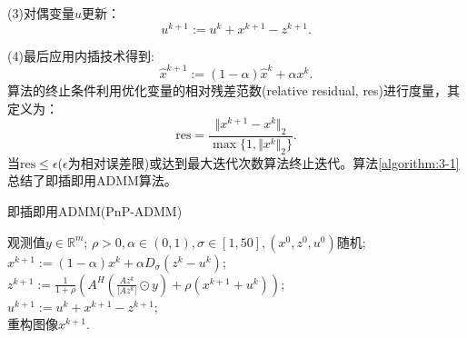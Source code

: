 (3)对偶变量$u$更新：
\begin{equation} \label{equation:3-6}
	u^{k+1}:=u^k+x^{k+1}-z^{k+1}.
\end{equation}

(4)最后应用内插技术得到:
\begin{equation} \label{equation:3-7}
	\hat{x}^{k+1} := (1-\alpha)\hat{x}^k+\alpha{x^k}.
\end{equation}
算法的终止条件利用优化变量的相对残差范数(relative residual, res)进行度量，其定义为：
\begin{equation} \label{equation:3-8}
	\text{res}=\frac{\Vert{x^{k+1}-x^k}\Vert_2}{\max\{1, \Vert{x^k}\Vert_2\}}.
\end{equation}
当$\text{res}\leq{\epsilon}$($\epsilon$为相对误差限)或达到最大迭代次数算法终止迭代。算法\ref{algorithm:3-1}总结了即插即用ADMM算法。
\begin{algorithm}[!htbp]
	\caption{即插即用ADMM(PnP-ADMM)}
	\label{algorithm:3-1}
	\begin{algorithmic}[1]
		\REQUIRE	观测值$y\in \mathbb{R}^m$; %
		\ENSURE		%
		$\rho > 0, \alpha\in (0,1), \sigma\in[1,50], (x^0,z^0,u^0)$随机; \\
		\STATE	$x^{k+1}:=(1-\alpha)x^k + \alpha{D_{\sigma}(z^k-u^k)}$; \\ %
		\STATE	$z^{k+1}:=\frac{1}{1+\rho}\left({A^{\mathit{H}}\left(\frac{Az^k}{\vert{Az^k}\vert}\odot{y}\right)}+\rho{(x^{k+1}+u^k)}\right)$; \\	%
		\STATE	$u^{k+1}:=u^k+x^{k+1}-z^{k+1}$; \\ %
		\ENDWHILE
		\RETURN 重构图像$x^{k+1}$. %
	\end{algorithmic}
\end{algorithm}

